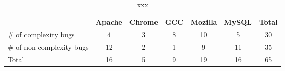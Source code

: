 \begin{table*}[tb!]
\begin{adjustwidth}{-.5in}{-.5in}
\small
\centering
{
\begin{tabular}{|lcccccc|}
\hline
                                                                                  &   Apache  &   Chrome   &  GCC   &    Mozilla   &   MySQL  &  Total\\
\hline
\# of complexity bugs                                                             &   4       &    3       &   8    &    10        &   5      &   30 \\
\# of non-complexity bugs                                                         &   12      &    2       &   1    &     9        &   11     &   35 \\
\hline
Total			                                                                  &  16       &    5       &   9    &   19         &   16     &  65 \\
\hline
\end{tabular}
}
\end{adjustwidth}
\caption{xxx}
\label{tab:compare}
\end{table*}